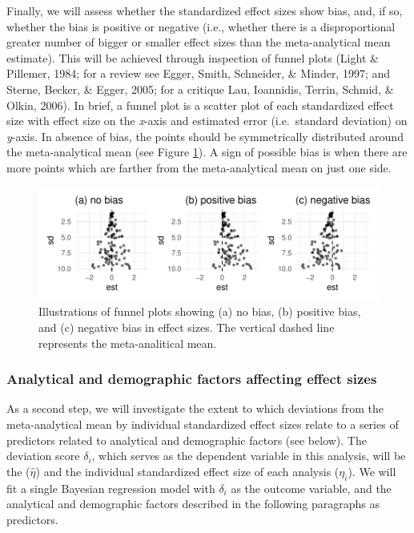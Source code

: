 \documentclass[
  english,
  man,floatsintext]{apa6}
\begin{document}
Finally, we will assess whether the standardized effect sizes show bias, and, if so, whether the bias is positive or negative (i.e., whether there is a disproportional greater number of bigger or smaller effect sizes than the meta-analytical mean estimate).
This will be achieved through inspection of funnel plots (Light \& Pillemer, 1984; for a review see Egger, Smith, Schneider, \& Minder, 1997; and Sterne, Becker, \& Egger, 2005; for a critique Lau, Ioannidis, Terrin, Schmid, \& Olkin, 2006).
In brief, a funnel plot is a scatter plot of each standardized effect size with effect size on the \emph{x}-axis and estimated error (i.e.~standard deviation) on \emph{y}-axis.
In absence of bias, the points should be symmetrically distributed around the meta-analytical mean (see Figure \ref{fig:funnel-plot}).
A sign of possible bias is when there are more points which are farther from the meta-analytical mean on just one side.

\begin{figure}
\centering
\includegraphics{Draft_RR_files/figure-latex/funnel-plot-1.pdf}
\caption{\label{fig:funnel-plot}Illustrations of funnel plots showing (a) no bias, (b) positive bias, and (c) negative bias in effect sizes. The vertical dashed line represents the meta-analitical mean.}
\end{figure}

\hypertarget{ana-factors}{%
\subsubsection{Analytical and demographic factors affecting effect sizes}\label{ana-factors}}

As a second step, we will investigate the extent to which deviations from the meta-analytical mean by individual standardized effect sizes relate to a series of predictors related to analytical and demographic factors (see below). The deviation score \(\delta_i\), which serves as the dependent variable in this analysis, will be the  (\(\hat{\eta}\)) and the individual standardized effect size of each analysis (\(\eta_i\)).
We will fit a single Bayesian regression model with \(\delta_i\) as the outcome variable, and the analytical and demographic factors described in the following paragraphs as predictors.
\end{document}
